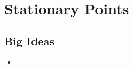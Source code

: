 \chapter{Stationary Points}
\label{chap:SP}

\section{Big Ideas}
\label{sec:SP Big Ideas}
\begin{itemize}
  \item 
\end{itemize}